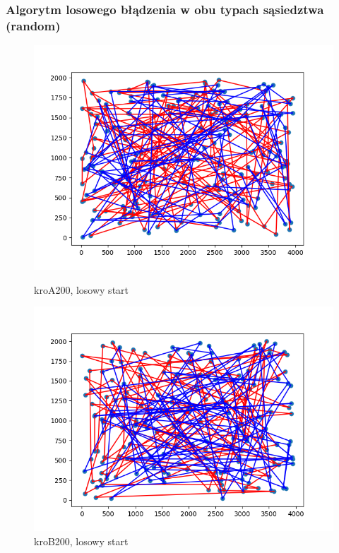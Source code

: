 \documentclass[11pt]{article}
\begin{document}
\subsubsection{Algorytm losowego błądzenia w  obu typach sąsiedztwa (random)}
\begin{figure}[H]
    \centering
    \begin{minipage}[t]{0.45\textwidth}
        \centering
        \includegraphics[width=\linewidth]{best_paths/kroA200/traverse_random/randomstart}
        \caption{kroA200, losowy start}
    \end{minipage}
    \hfill
    \begin{minipage}[t]{0.45\textwidth}
        \centering
        \includegraphics[width=\linewidth]{best_paths/kroB200/traverse_random/randomstart}
        \caption{kroB200, losowy start}
    \end{minipage}


\end{figure}
\end{document}
